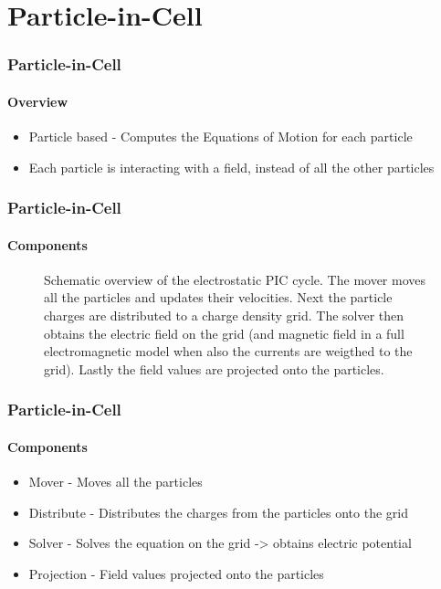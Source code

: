 \documentclass{beamer}
\begin{document}
\section{Particle-in-Cell} %
\label{sec:sec2}
\label{sub:ssec1}
\begin{frame}
	\frametitle{Particle-in-Cell}
	\framesubtitle{Overview}
		\begin{itemize}
			\item Particle based - Computes the Equations of Motion for each particle
			\item Each particle is interacting with a field, instead of all the other particles
		\end{itemize}
	\centering
\end{frame}
\begin{frame}
	\frametitle{Particle-in-Cell}
	\framesubtitle{Components}
	\begin{figure}
		\center
		\resizebox{11.cm}{3.cm}{
			
		}
		\caption{Schematic overview of the electrostatic PIC cycle. The mover moves all the particles and updates their velocities.
		Next the particle charges are distributed to a charge density grid. The solver then
		obtains the electric field on the grid (and magnetic field in a full electromagnetic model when also the currents are weigthed to the grid). Lastly the field values are
		projected onto the particles.}
		\label{fig:schematic}
	\end{figure}
\end{frame}
\begin{frame}
	\frametitle{Particle-in-Cell}
	\framesubtitle{Components}
	\begin{itemize}
		\item Mover - Moves all the particles
		\item Distribute - Distributes the charges from the particles onto the grid
		\item Solver - Solves the equation on the grid -> obtains electric potential
		\item Projection - Field values projected onto the particles
	\end{itemize}
\end{frame}
%
\end{document}
